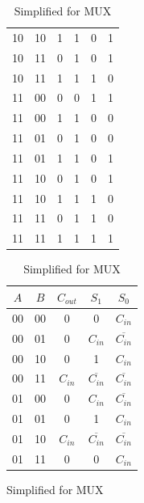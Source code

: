 \documentclass[12pt]{article}
\begin{document}
\begin{table}[H]
\begin{subfigure}{0.4\linewidth}
\begin{tabular}{c c c | c c c}
            10  & 10  & 1        & 1         & 0     & 1     \\
            10  & 11  & 0        & 1         & 0     & 1     \\
            10  & 11  & 1        & 1         & 1     & 0     \\
            11  & 00  & 0        & 0         & 1     & 1     \\
            11  & 00  & 1        & 1         & 0     & 0     \\
            11  & 01  & 0        & 1         & 0     & 0     \\
            11  & 01  & 1        & 1         & 0     & 1     \\
            11  & 10  & 0        & 1         & 0     & 1     \\
            11  & 10  & 1        & 1         & 1     & 0     \\
            11  & 11  & 0        & 1         & 1     & 0     \\
            11  & 11  & 1        & 1         & 1     & 1     \\
            \bottomrule
        \end{tabular}
    \end{subfigure}
    \begin{subfigure}{0.4\linewidth}
        \caption{Simplified for MUX}
        \label{tab:mux-simplified}
        \begin{tabular}{c c | c c c}
            \toprule
            $A$ & $B$ & $C_{out}$ & $S_1$               & $S_0$               \\
            \midrule
            00  & 00  & 0         & 0                   & $C_{in}$            \\
            00  & 01  & 0         & $C_{in}$            & $\overline{C_{in}}$ \\
            00  & 10  & 0         & 1                   & $C_{in}$            \\
            00  & 11  & $C_{in}$  & $\overline{C_{in}}$ & $\overline{C_{in}}$ \\
            01  & 00  & 0         & $C_{in}$            & $\overline{C_{in}}$ \\
            01  & 01  & 0         & 1                   & $C_{in}$            \\
            01  & 10  & $C_{in}$  & $\overline{C_{in}}$ & $\overline{C_{in}}$ \\
            01  & 11  & 0         & 0                   & $C_{in}$            \\

\end{tabular}
\end{subfigure}
\end{table}
\end{document}
